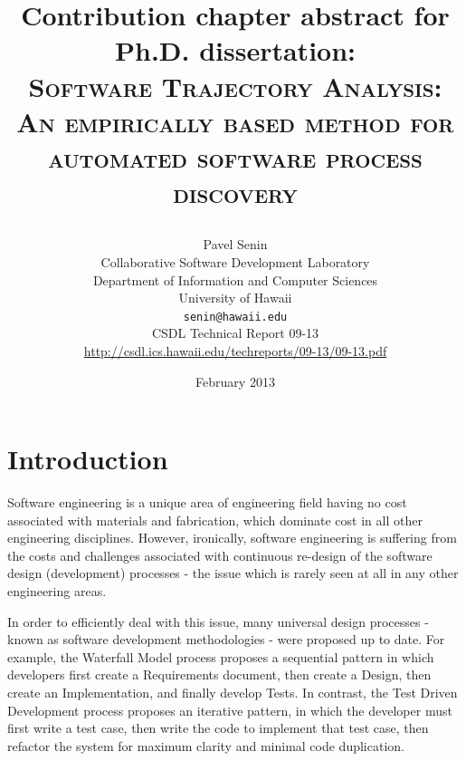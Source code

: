 \documentclass[11pt,oneside]{article}
\numberwithin{equation}{subsection}
\begin{document}
\title{Contribution chapter abstract for Ph.D. dissertation: \\
       \textsc{Software Trajectory Analysis:} \\
       \textsc{An empirically based method for automated software process discovery} \\
       \author{Pavel Senin \\
               Collaborative Software Development Laboratory \\
               Department of Information and Computer Sciences \\
               University of Hawaii \\[0.3cm]
               \texttt{senin@hawaii.edu} \\[0.3cm]
               CSDL Technical Report 09-13 \\
               \url{http://csdl.ics.hawaii.edu/techreports/09-13/09-13.pdf}
       }
       \date{February 2013}
}
\maketitle

\clearpage


\section{Introduction}
Software engineering is a unique area of engineering field having no cost associated with materials
and fabrication, which dominate cost in all other engineering disciplines. 
However, ironically, software engineering is suffering from the costs and challenges
associated with continuous re-design of the software design (development) processes - the issue
which is rarely seen at all in any other engineering areas. 

In order to efficiently deal with this issue, many universal design processes - known as 
software development methodologies - were proposed up to date. 
For example, the Waterfall Model process proposes a sequential pattern in which developers 
first create a Requirements document, then create a Design, then create an Implementation, 
and finally develop Tests. 
In contrast, the Test Driven Development process proposes an iterative pattern,
in which the developer  must first write a test case, then write the code to implement 
that test case, then refactor  the system for maximum clarity and minimal code duplication.
\end{document}
